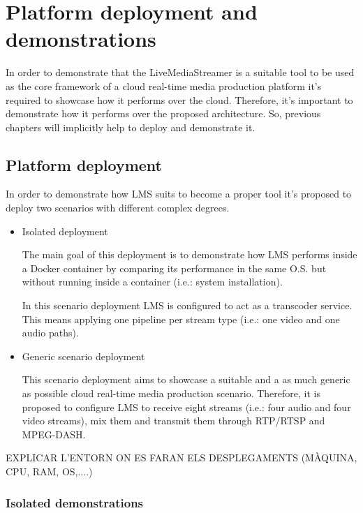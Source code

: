 \chapter{Platform deployment and demonstrations}\label{H:platformDeploymentAndDemonstrations}

In order to demonstrate that the LiveMediaStreamer is a suitable tool to be used as the core framework of a cloud real-time media production platform it's required to showcase how it performs over the cloud. Therefore, it's important to demonstrate how it performs over the proposed architecture. So, previous chapters will implicitly help to deploy and demonstrate it.

\section{Platform deployment}

In order to demonstrate how LMS suits to become a proper tool it's proposed to deploy two scenarios with different complex degrees.

\begin{itemize}
\item Isolated deployment \hfill

The main goal of this deployment is to demonstrate how LMS performs inside a Docker container by comparing its performance in the same O.S. but without running inside a container (i.e.: system installation).

In this scenario deployment LMS is configured to act as a transcoder service. This means applying one pipeline per stream type (i.e.: one video and one audio paths).

\item Generic scenario deployment \hfill

This scenario deployment aims to showcase a suitable and a as much generic as possible cloud real-time media production scenario. Therefore, it is proposed to configure LMS to receive eight streams (i.e.: four audio and four video streams), mix them and transmit them through RTP/RTSP and MPEG-DASH. 
\end{itemize}

EXPLICAR L'ENTORN ON ES FARAN ELS DESPLEGAMENTS (MÀQUINA, CPU, RAM, OS,....)

\subsection{Isolated demonstrations}

